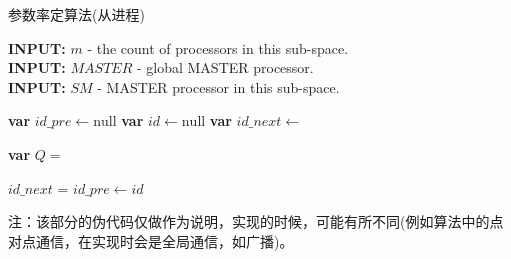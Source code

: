 \begin{algorithm}[H]
\caption{参数率定算法(从进程)}\label{algorithm_params}
\begin{flushleft}
    \textbf{INPUT:} $m$ - the count of processors in this sub-space.\\
    \textbf{INPUT:} $MASTER$ - global MASTER processor.\\
    \textbf{INPUT:} $SM$ - MASTER processor in this sub-space.
\end{flushleft}
\begin{algorithmic}[1]

\State \textbf{var} $id\_pre \gets \text{null} $
\State \textbf{var} $id \gets \text{null}$
\State \textbf{var} $id\_next \gets$ 
    \State {} 
\EndIf

        \State {} 
        \State {} 
    \EndIf
    \State {}
    \State {}

    \State \textbf{var} $Q=$   
        \State {}
    \EndIf

        \State $id\_next$ =   
    \EndIf
        \State {}
    \EndIf
    \State $id\_pre \gets id $
\EndWhile
\end{algorithmic}
\end{algorithm}

注：该部分的伪代码仅做作为说明，实现的时候，可能有所不同(例如算法中的点对点通信，在实现时会是全局通信，如广播)。
